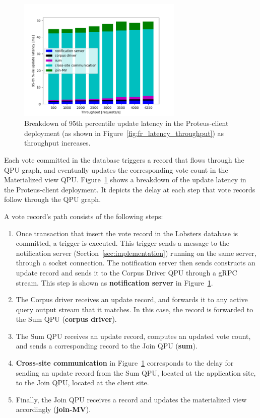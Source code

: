 \begin{figure}[H]
\centering
  \includegraphics[width=0.7\textwidth]{./figures/evaluation/fr_latency_throughput_breakdown.png}
  \caption{Breakdown of 95th percentile update latency in the Proteus-client deployment
  (as shown in Figure~\ref{fig:fr_latency_throughput}) as throughput increases.}
  \label{fig:fr_latency_throughput_breakdown}
\end{figure}

Each vote committed in the database triggers a record that flows through the QPU graph, and eventually updates the corresponding
vote count in the Materialized view QPU.
Figure~\ref{fig:fr_latency_throughput_breakdown} shows a breakdown of the update latency in the Proteus-client
deployment.
It depicts the delay at each step that vote records follow through the QPU graph.

A vote record's path consists of the following steps:
\begin{enumerate}
  \item Once transaction that insert the vote record in the Lobsters database is committed,
  a trigger is executed.
  This trigger sends a message to the notification server (Section~\ref{sec:implementation}) running on the same server,
  through a socket connection.
  The notification server then sends constructs an update record and sends it to the Corpus Driver QPU through a gRPC stream.
  This step is shown as \textbf{notification server} in Figure~\ref{fig:fr_latency_throughput_breakdown}.

  \item The Corpus driver receives an update record, and forwards it to any active query output stream that it matches.
  In this case, the record is forwarded to the Sum QPU (\textbf{corpus driver}).

  \item The Sum QPU receives an update record, computes an updated vote count,
  and sends a corresponding record to the Join QPU (\textbf{sum}).

  \item \textbf{Cross-site communication} in Figure~\ref{fig:fr_latency_throughput_breakdown} corresponds to the delay for
  sending an update record from the Sum QPU, located at the application site, to the Join QPU, located at the client site.

  \item Finally, the Join QPU receives a record and updates the materialized view accordingly (\textbf{join-MV}).

\end{enumerate}

